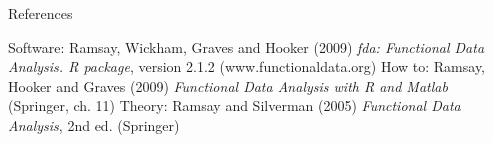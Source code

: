 \documentclass[compress]{beamer}
\begin{document}
\begin{frame}{References}

Software:   Ramsay, Wickham, Graves and Hooker (2009)
\emph{fda: Functional Data Analysis. R package}, version 2.1.2
(www.functionaldata.org) 
\newline \newline 
How to:  Ramsay, Hooker and Graves (2009)
\emph{Functional Data Analysis with R and Matlab}
(Springer, ch. 11)
\newline \newline
Theory:  Ramsay and Silverman (2005)
\emph{Functional Data Analysis}, 2nd ed.
(Springer)

\end{frame}
\end{document}
